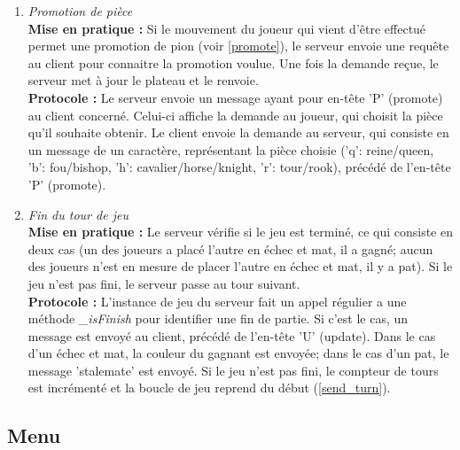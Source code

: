 \documentclass[10pt, a4paper]{article}
\begin{document}
\begin{enumerate}
\item \textit{Promotion de pièce}\\
\textbf{Mise en pratique :} Si le mouvement du joueur qui vient d'être effectué permet une promotion de pion (voir \ref{promote}), le serveur envoie une requête au client pour connaitre la promotion voulue. Une fois la demande reçue, le serveur met à jour le plateau et le renvoie.\\
\textbf{Protocole :} Le serveur envoie un message ayant pour en-tête 'P' (promote) au client concerné. Celui-ci affiche la demande au joueur, qui choisit la pièce qu'il souhaite obtenir. Le client envoie la demande au serveur, qui consiste en un message de un caractère, représentant la pièce choisie ('q':  reine/queen, 'b': fou/bishop, 'h': cavalier/horse/knight, 'r': tour/rook), précédé de l'en-tête 'P' (promote).

\item \textit{Fin du tour de jeu} \\
\textbf{Mise en pratique :} Le serveur vérifie si le jeu est terminé, ce qui consiste en deux cas (un des joueurs a placé l'autre en échec et mat, il a gagné; aucun des joueurs n'est en mesure de placer l'autre en échec et mat, il y a pat). Si le jeu n'est pas fini, le serveur passe au tour suivant.\\
\textbf{Protocole :} L'instance de jeu du serveur fait un appel régulier a une méthode \textit{\_isFinish} pour identifier une fin de partie. Si c'est le cas, un message est envoyé au client, précédé de l'en-tête 'U' (update). Dans le cas d'un échec et mat, la couleur du gagnant est envoyée; dans le cas d'un pat, le message 'stalemate' est envoyé. Si le jeu n'est pas fini, le compteur de tours est incrémenté et la boucle de jeu reprend du début (\ref{send_turn}).

\end{enumerate}

\subsection{Menu}
\end{document}
